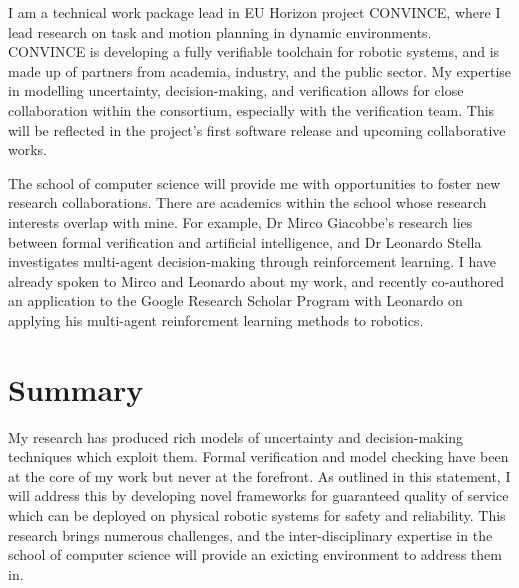 \documentclass[12pt]{article}
\begin{document}
I am a technical work package lead in EU Horizon project CONVINCE, where I lead research on task and motion planning in dynamic environments.
%
CONVINCE is developing a fully verifiable toolchain for robotic systems, and is made up of partners from academia, industry, and the public sector.
%
My expertise in modelling uncertainty, decision-making, and verification allows for close collaboration within the consortium, especially with the verification team.
%
This will be reflected in the project's first software release and upcoming collaborative works.

The school of computer science will provide me with opportunities to foster new research collaborations.
%
There are academics within the school whose research interests overlap with mine.
%
For example, Dr Mirco Giacobbe's research lies between formal verification and artificial intelligence, and Dr Leonardo Stella investigates multi-agent decision-making through reinforcement learning.
%
I have already spoken to Mirco and Leonardo about my work, and recently co-authored an application to the Google Research Scholar Program with Leonardo on applying his multi-agent reinforcment learning methods to robotics.


\section*{Summary}

My research has produced rich models of uncertainty and decision-making techniques which exploit them.
%
Formal verification and model checking have been at the core of my work but never at the forefront.
%
As outlined in this statement, I will address this by developing novel frameworks for guaranteed quality of service which can be deployed on physical robotic systems for safety and reliability.
%
This research brings numerous challenges, and the inter-disciplinary expertise in the school of computer science will provide an exicting environment to address them in.
\end{document}
